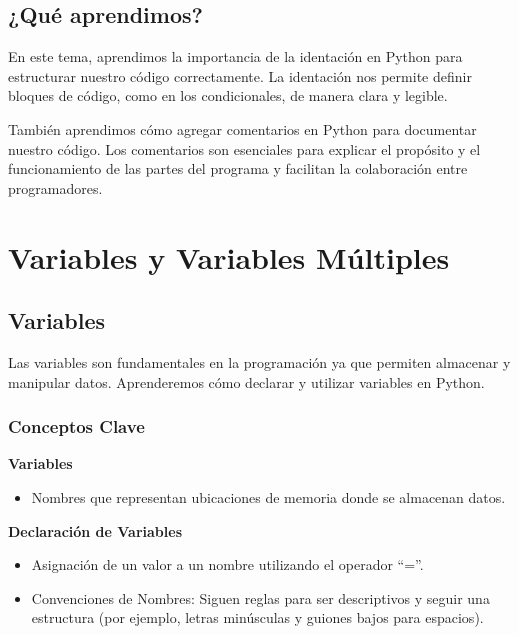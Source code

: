 \documentclass[
  a4paper,
  DIV=11,
  numbers=noendperiod,
  onepage,
  openany]{scrreprt}
\providecommand{\tightlist}{%
  \setlength{\itemsep}{0pt}\setlength{\parskip}{0pt}}\usepackage{longtable,booktabs,array}
\begin{document}
\section{¿Qué aprendimos?}\label{quuxe9-aprendimos}

En este tema, aprendimos la importancia de la identación en Python para
estructurar nuestro código correctamente. La identación nos permite
definir bloques de código, como en los condicionales, de manera clara y
legible.

También aprendimos cómo agregar comentarios en Python para documentar
nuestro código. Los comentarios son esenciales para explicar el
propósito y el funcionamiento de las partes del programa y facilitan la
colaboración entre programadores.

\chapter{Variables y Variables
Múltiples}\label{variables-y-variables-muxfaltiples}

\section{Variables}\label{variables}

Las variables son fundamentales en la programación ya que permiten
almacenar y manipular datos. Aprenderemos cómo declarar y utilizar
variables en Python.

\subsection{Conceptos Clave}\label{conceptos-clave-4}

\textbf{Variables}

\begin{itemize}
\tightlist
\item
  Nombres que representan ubicaciones de memoria donde se almacenan
  datos.
\end{itemize}

\textbf{Declaración de Variables}

\begin{itemize}
\tightlist
\item
  Asignación de un valor a un nombre utilizando el operador ``=''.
\item
  Convenciones de Nombres: Siguen reglas para ser descriptivos y seguir
  una estructura (por ejemplo, letras minúsculas y guiones bajos para
  espacios).
\end{itemize}
\end{document}
